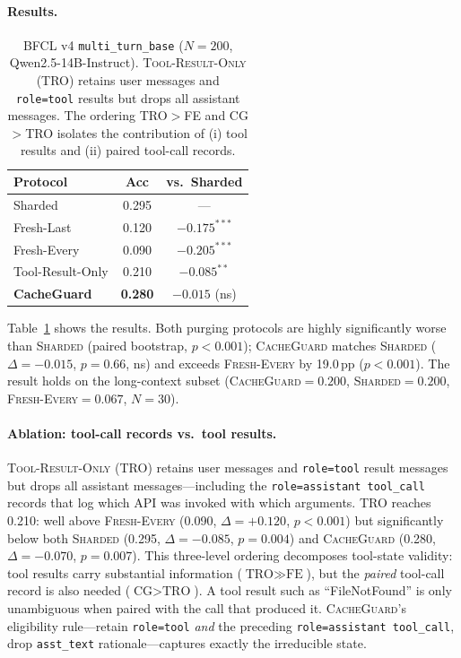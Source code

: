 \documentclass{article}
\begin{document}
\paragraph{Results.}

\begin{table}[t]
\centering
\caption{BFCL v4 \texttt{multi\_turn\_base} ($N=200$, Qwen2.5-14B-Instruct). \textsc{Tool-Result-Only} (TRO) retains user messages and \texttt{role=tool} results but drops all assistant messages. The ordering TRO$>$FE and CG$>$TRO isolates the contribution of (i) tool results and (ii) paired tool-call records.}
\label{tab:bfcl}
\begin{tabular}{lcc}
\toprule
Protocol & Acc & vs.\ Sharded \\
\midrule
Sharded & 0.295 & --- \\
Fresh-Last & 0.120 & $-0.175^{***}$ \\
Fresh-Every & 0.090 & $-0.205^{***}$ \\
Tool-Result-Only & 0.210 & $-0.085^{**}$ \\
\midrule
\textbf{CacheGuard} & \textbf{0.280} & $-0.015$ (ns) \\
\bottomrule
\end{tabular}
\end{table}

Table~\ref{tab:bfcl} shows the results. Both purging protocols are highly significantly worse than \textsc{Sharded} (paired bootstrap, $p<0.001$); \textsc{CacheGuard} matches \textsc{Sharded} ($\Delta=-0.015$, $p=0.66$, ns) and exceeds \textsc{Fresh-Every} by 19.0\,pp ($p<0.001$). The result holds on the long-context subset (\textsc{CacheGuard}$=0.200$, \textsc{Sharded}$=0.200$, \textsc{Fresh-Every}$=0.067$, $N=30$).

\paragraph{Ablation: tool-call records vs.\ tool results.}
\textsc{Tool-Result-Only} (TRO) retains user messages and \texttt{role=tool} result messages but drops all assistant messages---including the \texttt{role=assistant tool\_call} records that log which API was invoked with which arguments. TRO reaches 0.210: well above \textsc{Fresh-Every} (0.090, $\Delta=+0.120$, $p<0.001$) but significantly below both \textsc{Sharded} (0.295, $\Delta=-0.085$, $p=0.004$) and \textsc{CacheGuard} (0.280, $\Delta=-0.070$, $p=0.007$). This three-level ordering decomposes tool-state validity: tool results carry substantial information ($\text{TRO} \gg \text{FE}$), but the \emph{paired} tool-call record is also needed ($\text{CG} > \text{TRO}$). A tool result such as ``FileNotFound'' is only unambiguous when paired with the call that produced it. \textsc{CacheGuard}'s eligibility rule---retain \texttt{role=tool} \emph{and} the preceding \texttt{role=assistant tool\_call}, drop \texttt{asst\_text} rationale---captures exactly the irreducible state.
\end{document}
